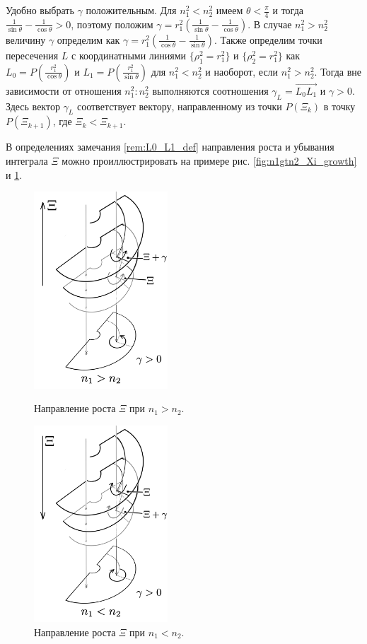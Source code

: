 \begin{remark}
Удобно выбрать $\gamma$ положительным. Для $n_1^2 < n_2^2$ имеем $\theta < \frac{\pi}{4}$ и тогда $\frac{1}{\sin \theta} - \frac{1}{\cos \theta} > 0$, поэтому положим $\gamma =  r_1^2 \left( \frac{1}{\sin \theta} - \frac{1}{\cos \theta}  \right)$. В случае $n_1^2 > n_2^2$ величину $\gamma$ определим как $\gamma =  r_1^2 \left( \frac{1}{\cos \theta} - \frac{1}{\sin \theta}  \right)$.
Также определим точки пересечения $L$ с координатными линиями $\{ \rho_1^2 = r_1^2 \}$ и $\{ \rho_2^2 = r_1^2 \}$  как $L_0 = P(\frac{r_1^2}{\cos \theta})$ и  $L_1 = P(\frac{r_1^2}{\sin \theta})$ для $n_1^2 < n_2^2$ и наоборот, если $n_1^2>n_2^2$. 
Тогда вне зависимости от отношения $n_1^2 : n_2^2$ выполняются соотношения  $\gamma_L =  \overrightarrow{L_0 L_1}$ и $\gamma > 0$.
Здесь вектор $\gamma_L$ соответствует вектору, направленному из точки $P(\Xi_k)$ в точку $P(\Xi_{k+1})$, где $\Xi_k < \Xi_{k+1}$.
\label{rem:L0_L1_def}
\end{remark}

В определениях замечания \ref{rem:L0_L1_def} направления роста и убывания интеграла $\Xi$ можно проиллюстрировать на примере рис. \ref{fig:n1gtn2_Xi_growth} и \ref{fig:n1ltn2_Xi_growth}.
\begin{figure}[!htb]
\centering
\includegraphics[width=5cm]{images/section3_circular/n1gtn2.png}
    \caption{Направление роста $\Xi$ при $n_1 > n_2$.}
    \label{fig:n1gtn2_Xi_growth}
\endminipage\hfill
{}
\centering
\includegraphics[width=5cm]{images/section3_circular/n1ltn2.png}
    \caption{Направление роста $\Xi$ при $n_1 < n_2$.}
    \label{fig:n1ltn2_Xi_growth}
\endminipage\hfill
\end{figure}

